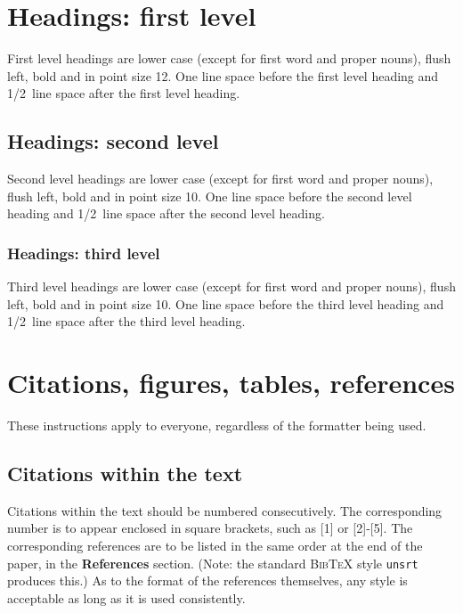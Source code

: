 \documentclass{article} %
\begin{document}
\section{Headings: first level}
\label{headings}

First level headings are lower case (except for first word and proper nouns),
flush left, bold and in point size 12. One line space before the first level
heading and 1/2~line space after the first level heading.

\subsection{Headings: second level}

Second level headings are lower case (except for first word and proper nouns),
flush left, bold and in point size 10. One line space before the second level
heading and 1/2~line space after the second level heading.

\subsubsection{Headings: third level}

Third level headings are lower case (except for first word and proper nouns),
flush left, bold and in point size 10. One line space before the third level
heading and 1/2~line space after the third level heading.

\section{Citations, figures, tables, references}
\label{others}

These instructions apply to everyone, regardless of the formatter being used.

\subsection{Citations within the text}

Citations within the text should be numbered consecutively. The corresponding
number is to appear enclosed in square brackets, such as [1] or [2]-[5]. The
corresponding references are to be listed in the same order at the end of the
paper, in the \textbf{References} section. (Note: the standard
\textsc{Bib\TeX} style \texttt{unsrt} produces this.) As to the format of the
references themselves, any style is acceptable as long as it is used
consistently.
\end{document}
